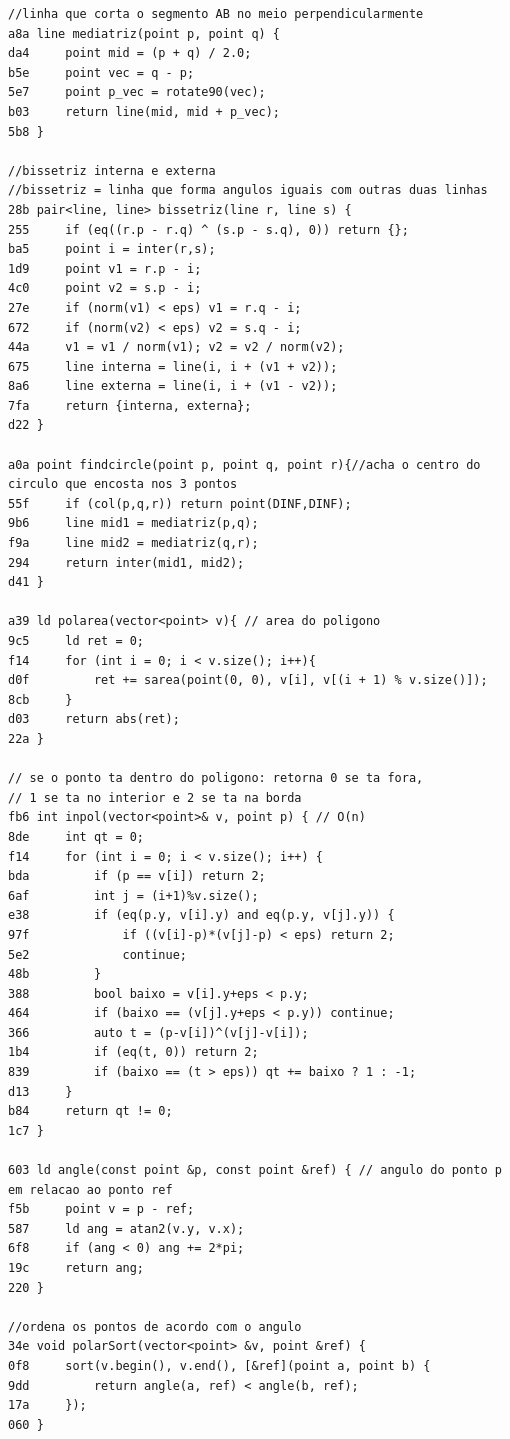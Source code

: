 \documentclass[11pt, a4paper, twoside]{article}
\begin{document}
\begin{lstlisting}
//linha que corta o segmento AB no meio perpendicularmente
a8a line mediatriz(point p, point q) {
da4     point mid = (p + q) / 2.0;
b5e     point vec = q - p;
5e7     point p_vec = rotate90(vec);
b03     return line(mid, mid + p_vec);
5b8 }

//bissetriz interna e externa
//bissetriz = linha que forma angulos iguais com outras duas linhas
28b pair<line, line> bissetriz(line r, line s) {
255     if (eq((r.p - r.q) ^ (s.p - s.q), 0)) return {};
ba5 	point i = inter(r,s);
1d9 	point v1 = r.p - i;
4c0     point v2 = s.p - i;
27e 	if (norm(v1) < eps) v1 = r.q - i;
672     if (norm(v2) < eps) v2 = s.q - i;
44a     v1 = v1 / norm(v1); v2 = v2 / norm(v2);
675     line interna = line(i, i + (v1 + v2));
8a6     line externa = line(i, i + (v1 - v2));
7fa     return {interna, externa};
d22 }

a0a point findcircle(point p, point q, point r){//acha o centro do circulo que encosta nos 3 pontos
55f 	if (col(p,q,r)) return point(DINF,DINF);
9b6 	line mid1 = mediatriz(p,q);
f9a 	line mid2 = mediatriz(q,r);
294 	return inter(mid1, mid2);
d41 }

a39 ld polarea(vector<point> v){ // area do poligono
9c5 	ld ret = 0;
f14 	for (int i = 0; i < v.size(); i++){
d0f 		ret += sarea(point(0, 0), v[i], v[(i + 1) % v.size()]);
8cb 	}
d03 	return abs(ret);
22a }

// se o ponto ta dentro do poligono: retorna 0 se ta fora,
// 1 se ta no interior e 2 se ta na borda
fb6 int inpol(vector<point>& v, point p) { // O(n)
8de 	int qt = 0;
f14 	for (int i = 0; i < v.size(); i++) {
bda 		if (p == v[i]) return 2;
6af 		int j = (i+1)%v.size();
e38 		if (eq(p.y, v[i].y) and eq(p.y, v[j].y)) {
97f 			if ((v[i]-p)*(v[j]-p) < eps) return 2;
5e2 			continue;
48b 		}
388 		bool baixo = v[i].y+eps < p.y;
464 		if (baixo == (v[j].y+eps < p.y)) continue;
366 		auto t = (p-v[i])^(v[j]-v[i]);
1b4 		if (eq(t, 0)) return 2;
839 		if (baixo == (t > eps)) qt += baixo ? 1 : -1;
d13 	}
b84 	return qt != 0;
1c7 }

603 ld angle(const point &p, const point &ref) { // angulo do ponto p em relacao ao ponto ref
f5b     point v = p - ref;
587     ld ang = atan2(v.y, v.x);
6f8     if (ang < 0) ang += 2*pi;
19c     return ang;
220 }

//ordena os pontos de acordo com o angulo
34e void polarSort(vector<point> &v, point &ref) {
0f8     sort(v.begin(), v.end(), [&ref](point a, point b) {
9dd         return angle(a, ref) < angle(b, ref);
17a     });
060 }


\end{lstlisting}
\end{document}
